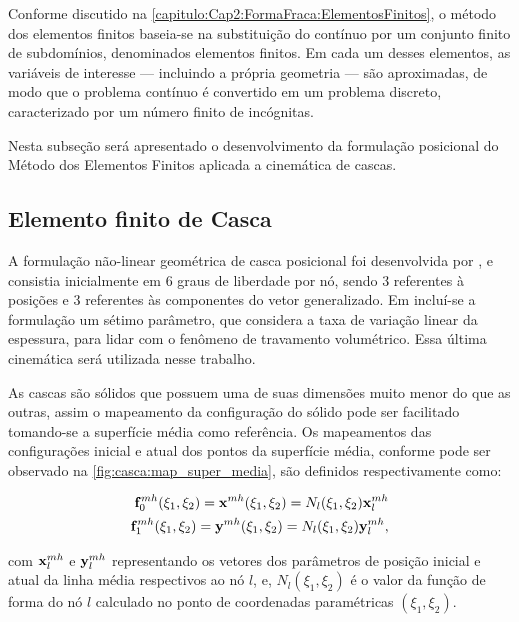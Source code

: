 Conforme discutido na \autoref{capitulo:Cap2:FormaFraca:ElementosFinitos}, o método dos elementos finitos baseia-se na substituição do contínuo por um conjunto finito de subdomínios, denominados elementos finitos. Em cada um desses elementos, as variáveis de interesse — incluindo a própria geometria — são aproximadas, de modo que o problema contínuo é convertido em um problema discreto, caracterizado por um número finito de incógnitas.

Nesta subseção será apresentado o desenvolvimento da formulação posicional do Método dos Elementos Finitos aplicada a cinemática de cascas.

\subsection{Elemento finito de Casca} \label{capitulo:Cap4:Mef:Casca}

A formulação não-linear geométrica de casca posicional foi desenvolvida por , e consistia inicialmente em 6 graus de liberdade por nó, sendo 3 referentes à posições e 3 referentes às componentes do vetor generalizado. Em  incluí-se a formulação um sétimo parâmetro, que considera a taxa de variação linear da espessura, para lidar com o fenômeno de travamento volumétrico. Essa última cinemática será utilizada nesse trabalho.

As cascas são sólidos que possuem uma de suas dimensões muito menor do que as outras, assim o mapeamento da configuração do sólido pode ser facilitado tomando-se a superfície média como referência. Os mapeamentos das configurações inicial e atual dos pontos da superfície média, conforme pode ser observado na \autoref{fig:casca:map_super_media}, são definidos respectivamente como:

\begin{align}
\mathbf{f}^{mh}_{0}(\xi_{1},\xi_{2}) = \mathbf{x}^{mh}(\xi_{1},\xi_{2}) = N_{l} (\xi_{1},\xi_{2}) \mathbf{x}_{l}^{mh}\label{eq:casca_Lposition_m}\\
\mathbf{f}^{mh}_{1}(\xi_{1},\xi_{2}) = \mathbf{y}^{mh}(\xi_{1},\xi_{2}) = N_{l} (\xi_{1},\xi_{2}) \mathbf{y}_{l}^{mh}, \label{eq:casca_Eposition_m}
\end{align}

\noindent com $\mathbf{x}_{l}^{mh}$ e $\mathbf{y}_{l}^{mh}$ representando os vetores dos parâmetros de posição inicial e atual da linha média respectivos ao nó $l$, e, $N_{l} (\xi_{1},\xi_{2})$ é o valor da função de forma do nó $l$ calculado no ponto de coordenadas paramétricas $(\xi_{1},\xi_{2})$.

